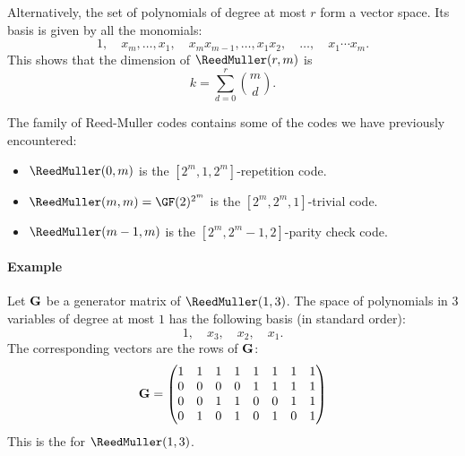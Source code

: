 \documentclass[a4paper, 11pt, openany]{book}
\begin{document}
Alternatively, the set of polynomials of degree at most $r$ form a vector space. Its basis is given by all the monomials:
\[
	1, \quad x_m, \dots, x_1, \quad x_m x_{m-1}, \dots, x_1 x_2, \quad \dots, \quad x_1 \cdots x_m.
\]
This shows that the dimension of $\ReedMuller(r,m)$ is
\[
	k = \sum_{d=0}^r \binom{m}{d}.
\]



The family of Reed-Muller codes contains some of the codes we have previously encountered:
\begin{itemize}
    \item $\ReedMuller(0,m)$ is the $[2^m, 1, 2^m]$-repetition code.

    \item $\ReedMuller(m,m) = \GF(2)^{2^m}$ is the $[2^m, 2^m, 1]$-trivial code.

    \item $\ReedMuller(m-1,m)$ is the $[2^m, 2^m - 1, 2]$-parity check code.
\end{itemize}


\paragraph{Example}
Let ${\bf G}$ be a generator matrix of $\ReedMuller(1,3)$. The space of polynomials in $3$ variables of degree at most $1$ has the following basis (in standard order):
\[
	1, \quad x_3, \quad x_2, \quad x_1.
\]
The corresponding vectors are the rows of ${\bf G}$:
\[
	{\bf G} = \begin{pmatrix}
	1 & 1 & 1 & 1 & 1 & 1 & 1 & 1 \\
	0 & 0 & 0 & 0 & 1 & 1 & 1 & 1 \\
	0 & 0 & 1 & 1 & 0 & 0 & 1 & 1 \\
	0 & 1 & 0 & 1 & 0 & 1 & 0 & 1
	\end{pmatrix}
\]
This is the  for $\ReedMuller(1,3)$.



\end{document}
